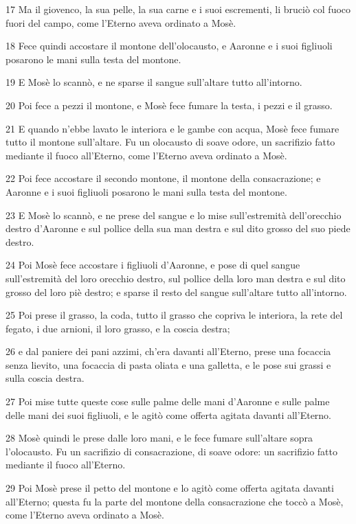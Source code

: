 \par 17 Ma il giovenco, la sua pelle, la sua carne e i suoi escrementi, li bruciò col fuoco fuori del campo, come l'Eterno aveva ordinato a Mosè.
\par 18 Fece quindi accostare il montone dell'olocausto, e Aaronne e i suoi figliuoli posarono le mani sulla testa del montone.
\par 19 E Mosè lo scannò, e ne sparse il sangue sull'altare tutto all'intorno.
\par 20 Poi fece a pezzi il montone, e Mosè fece fumare la testa, i pezzi e il grasso.
\par 21 E quando n'ebbe lavato le interiora e le gambe con acqua, Mosè fece fumare tutto il montone sull'altare. Fu un olocausto di soave odore, un sacrifizio fatto mediante il fuoco all'Eterno, come l'Eterno aveva ordinato a Mosè.
\par 22 Poi fece accostare il secondo montone, il montone della consacrazione; e Aaronne e i suoi figliuoli posarono le mani sulla testa del montone.
\par 23 E Mosè lo scannò, e ne prese del sangue e lo mise sull'estremità dell'orecchio destro d'Aaronne e sul pollice della sua man destra e sul dito grosso del suo piede destro.
\par 24 Poi Mosè fece accostare i figliuoli d'Aaronne, e pose di quel sangue sull'estremità del loro orecchio destro, sul pollice della loro man destra e sul dito grosso del loro piè destro; e sparse il resto del sangue sull'altare tutto all'intorno.
\par 25 Poi prese il grasso, la coda, tutto il grasso che copriva le interiora, la rete del fegato, i due arnioni, il loro grasso, e la coscia destra;
\par 26 e dal paniere dei pani azzimi, ch'era davanti all'Eterno, prese una focaccia senza lievito, una focaccia di pasta oliata e una galletta, e le pose sui grassi e sulla coscia destra.
\par 27 Poi mise tutte queste cose sulle palme delle mani d'Aaronne e sulle palme delle mani dei suoi figliuoli, e le agitò come offerta agitata davanti all'Eterno.
\par 28 Mosè quindi le prese dalle loro mani, e le fece fumare sull'altare sopra l'olocausto. Fu un sacrifizio di consacrazione, di soave odore: un sacrifizio fatto mediante il fuoco all'Eterno.
\par 29 Poi Mosè prese il petto del montone e lo agitò come offerta agitata davanti all'Eterno; questa fu la parte del montone della consacrazione che toccò a Mosè, come l'Eterno aveva ordinato a Mosè.
